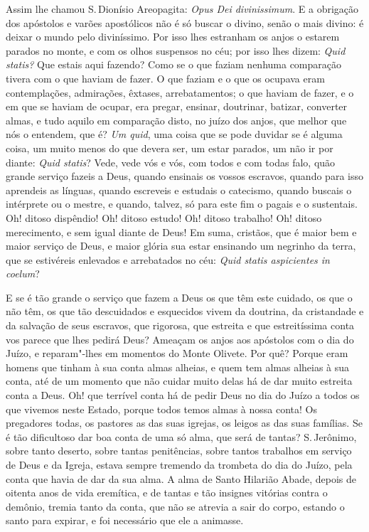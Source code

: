 Assim lhe chamou S.\,Dionísio Areopagita: \emph{Opus Dei divinissimum}. E
a obrigação dos apóstolos e varões apostólicos não é só buscar o divino,
senão o mais divino: é deixar o mundo pelo diviníssimo. Por isso lhes
estranham os anjos o estarem parados no monte, e com os olhos suspensos
no céu; por isso lhes dizem: \emph{Quid statis?} Que estais aqui
fazendo? Como se o que faziam nenhuma comparação tivera com o que
haviam de fazer. O que faziam e o que os ocupava eram contemplações,
admirações, êxtases, arrebatamentos; o que haviam de fazer, e o em que
se haviam de ocupar, era pregar, ensinar, doutrinar, batizar, converter
almas, e tudo aquilo em comparação disto, no juízo dos anjos, que melhor
que nós o entendem, que é? \emph{Um quid}, uma coisa que se pode duvidar
se é alguma coisa, um muito menos do que devera ser, um estar parados,
um não ir por diante: \emph{Quid statis}? Vede, vede vós e vós, com
todos e com todas falo,
quão grande serviço fazeis a Deus, quando ensinais os vossos
escravos, quando para isso aprendeis as línguas, quando escreveis e
estudais o catecismo, quando buscais o intérprete ou o mestre, e quando,
talvez, só para este fim o pagais e o sustentais. Oh! ditoso dispêndio!
Oh! ditoso estudo! Oh! ditoso trabalho! Oh! ditoso merecimento, e sem
igual diante de Deus! Em suma,
cristãos, que é maior bem e maior serviço de Deus, e maior glória sua
estar ensinando um negrinho da terra, que se estivéreis enlevados e
arrebatados no céu: \emph{Quid statis aspicientes in coelum}?

E se é tão grande o serviço que fazem a Deus os que têm este cuidado, os
que o não têm, os que tão descuidados e esquecidos vivem da doutrina, da
cristandade e da salvação de seus escravos, que rigorosa, que estreita e
que estreitíssima conta vos parece que lhes pedirá Deus? Ameaçam os
anjos aos apóstolos com o dia do Juízo, e reparam"-lhes em momentos do
Monte Olivete. Por quê? Porque eram homens que tinham à sua conta almas
alheias, e quem tem almas alheias à sua conta, até de um momento que não
cuidar muito delas há de dar muito estreita conta a Deus. Oh! que
terrível conta há de pedir Deus no dia do Juízo a todos os que vivemos
neste Estado, porque todos temos almas à nossa conta! Os pregadores
todas, os pastores as das suas igrejas, os leigos as das suas famílias.
Se é tão dificultoso dar boa conta de uma só alma, que será de tantas?
S.\,Jerônimo, sobre tanto deserto, sobre tantas penitências, sobre tantos
trabalhos em serviço de Deus e da Igreja, estava sempre tremendo da
trombeta do dia do Juízo, pela conta que havia de dar da sua alma. A
alma de Santo Hilarião Abade, depois de oitenta anos de vida eremítica,
e de tantas e tão insignes vitórias contra o demônio, tremia tanto da
conta, que não se atrevia a sair do corpo, estando o santo para expirar,
e foi necessário que ele a animasse.

